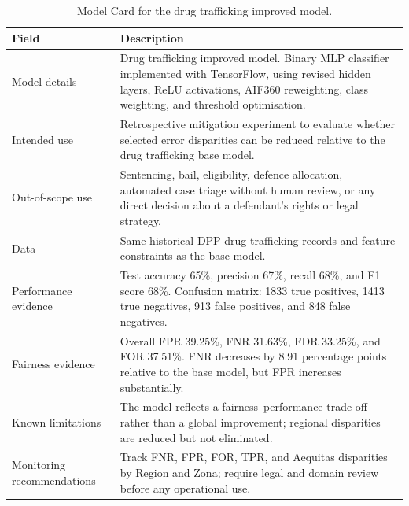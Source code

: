 \documentclass[fleqn,10pt]{wlscirep}
\begin{document}
\begin{table}[!htb]
\centering
\begin{tabular}{|p{3.5cm}|p{11cm}|}
\hline
\textbf{Field} & \textbf{Description} \\ \hline
Model details & Drug trafficking improved model. Binary MLP classifier implemented with TensorFlow, using revised hidden layers, ReLU activations, AIF360 reweighting, class weighting, and threshold optimisation. \\ \hline
Intended use & Retrospective mitigation experiment to evaluate whether selected error disparities can be reduced relative to the drug trafficking base model. \\ \hline
Out-of-scope use & Sentencing, bail, eligibility, defence allocation, automated case triage without human review, or any direct decision about a defendant's rights or legal strategy. \\ \hline
Data & Same historical DPP drug trafficking records and feature constraints as the base model. \\ \hline
Performance evidence & Test accuracy 65\%, precision 67\%, recall 68\%, and F1 score 68\%. Confusion matrix: 1833 true positives, 1413 true negatives, 913 false positives, and 848 false negatives. \\ \hline
Fairness evidence & Overall FPR 39.25\%, FNR 31.63\%, FDR 33.25\%, and FOR 37.51\%. FNR decreases by 8.91 percentage points relative to the base model, but FPR increases substantially. \\ \hline
Known limitations & The model reflects a fairness--performance trade-off rather than a global improvement; regional disparities are reduced but not eliminated. \\ \hline
Monitoring recommendations & Track FNR, FPR, FOR, TPR, and Aequitas disparities by Region and Zona; require legal and domain review before any operational use. \\ \hline
\end{tabular}
\caption{Model Card for the drug trafficking improved model.}
\label{tab:model_card_dt_improved}
\end{table}
\end{document}

